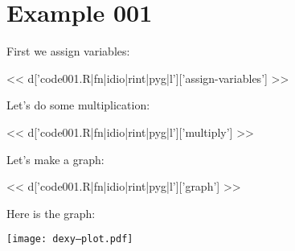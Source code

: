 \section{Example 001}

First we assign variables:

<< d['code001.R|fn|idio|rint|pyg|l']['assign-variables'] >>

Let's do some multiplication:

<< d['code001.R|fn|idio|rint|pyg|l']['multiply'] >>

Let's make a graph:

<< d['code001.R|fn|idio|rint|pyg|l']['graph'] >>

Here is the graph:

\texttt{[image: dexy--plot.pdf]}

